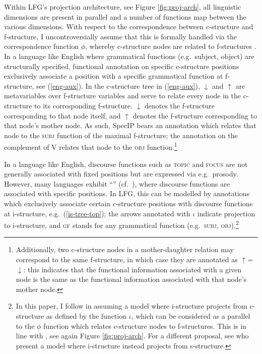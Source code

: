 \documentclass[output=paper,colorlinks,citecolor=brown]{langscibook}
\begin{document}
Within LFG's projection architecture, see Figure \ref{fig:proj-arch}, all linguistic dimensions are present in parallel and a number of functions map between the various dimensions. With respect to the correspondence between c-structure and f-structure, 
I uncontroversially assume that this is formally handled via the correspondence function $\phi$, whereby c-structure nodes are related to f-structures \citep{Bresnan2015lexical,dalrymple2019oxford}.
In a language like English where grammatical functions (e.g.~subject, object) are structurally specified, functional annotation on specific c-structure positions exclusively associate a position with a specific grammatical function at f-structure, see (\ref{eng-aux}). 
In the c-structure tree in (\ref{eng-aux}), $\downarrow$ and $\uparrow$ are metavariables over f-structure variables and serve to relate every node in the c-structure to its corresponding f-structure. $\downarrow$ denotes the f-structure corresponding to that node itself, and $\uparrow$ denotes the f-structure corresponding to that node's mother node. As such, SpecIP bears an annotation which relates that node to the \textsc{subj} function of the maximal f-structure; the annotation on the complement of V relates that node to the \textsc{obj} function.\footnote{Additionally, two c-structure nodes in a mother-daughter relation may correspond to the same f-structure, in which case they are annotated as $\uparrow$=$\downarrow$: 
this indicates that the functional information associated with a given node is the same as the functional information associated with that node's mother node.} 

In a language like English, discourse functions such as \textsc{topic} and \textsc{focus} are not generally associated with fixed positions but are expressed via e.g.~prosody. However, many languages exhibit ``'' (cf.~\citealp{vilkuna1989free,Kiss1995discourse}), where discourse functions are associated with specific positions. In LFG, this can be modelled by annotations which exclusively associate certain c-structure positions with discourse functions at i-structure, e.g.~(\ref{is-tree-top}); the arrows annotated with $\iota$ indicate projection to i-structure, and \textsc{gf} stands for any grammatical function (e.g.~\textsc{subj, obj}).\footnote{In this paper, I follow \citet{butt-king97} in assuming a model where i-structure projects from c-structure as defined by the function $\iota$, which can be considered as a parallel to the $\phi$ function which relates c-structure nodes to f-structures. This is in line with \citet{asudeh2006direct}, see again Figure \ref{fig:proj-arch}.
For a different proposal, see \citet{dalrymple2019oxford} who present a model where i-structure instead projects from s-structure.}
\end{document}
